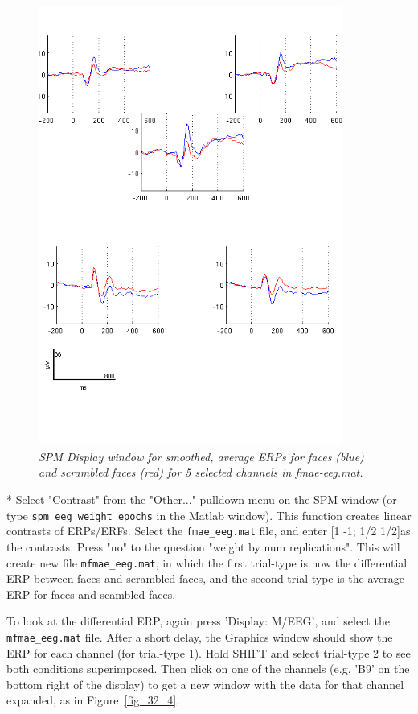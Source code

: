 \begin{figure}
\begin{center}
\includegraphics[width=100mm]{multimodal/figures/figure_32_3}
\caption{\em SPM Display window for smoothed, average ERPs for faces (blue) and scrambled faces (red) for 5 selected channels in fmae-eeg.mat. \label{fig_32_3}}
\end{center}
\end{figure}

* Select "Contrast" from the "Other..." pulldown menu on the SPM window (or type \verb!spm_eeg_weight_epochs! in the Matlab window). This function creates linear contrasts of ERPs/ERFs. Select the \verb!fmae_eeg.mat! file, and enter [1 -1; 1/2 1/2]as the contrasts. Press "no" to the question "weight by num replications". This will create new file \verb!mfmae_eeg.mat!, in which the first trial-type is now the differential ERP between faces and scrambled faces, and the second trial-type is the average ERP for faces and scambled faces.

To look at the differential ERP, again press 'Display: M/EEG', and select the \verb!mfmae_eeg.mat! file. After a short delay, the Graphics window should show the ERP for each channel (for trial-type 1). Hold SHIFT and select trial-type 2 to see both conditions superimposed. Then click on one of the channels (e.g, 'B9' on the bottom right of the display) to get a new window with the data for that channel expanded, as in Figure~\ref{fig_32_4}.


